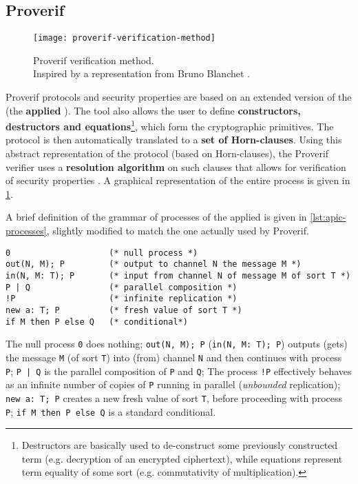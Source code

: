 \subsection{Proverif}
\begin{figure}[t]
    \texttt{[image: proverif-verification-method]}
    \centering
    \caption{Proverif verification method.\\Inspired by a representation from Bruno Blanchet \cite{SymbolicComputationalBlanchet}.}
    \label{fig:proverif-verification-method}
\end{figure}
Proverif protocols and security properties are based on an extended version of the \pic (the \textbf{applied \picnospace}). The tool also allows the user to define \textbf{constructors, destructors and equations}\footnote{Destructors are basically used to de-construct some previously constructed term (e.g. decryption of an encrypted ciphertext), while equations represent term equality of some sort (e.g. commutativity of multiplication).}, which form the cryptographic primitives. The protocol is then automatically translated to a \textbf{set of Horn-clauses}. Using this abstract representation of the protocol (based on Horn-clauses), the Proverif verifier uses a \textbf{resolution algorithm} on such clauses that allows for verification of security properties \cite{SymbolicComputationalBlanchet}.
A graphical representation of the entire process is given in \cref{fig:proverif-verification-method}.

A brief definition of the grammar of processes of the applied \pic is given in \cref{lst:apic-processes}, slightly modified to match the one actually used by Proverif.

\lstset{language=proverif}
\begin{lstlisting}[caption={Applied \pic grammar of processes.}, label={lst:apic-processes}]
0                    (* null process *)
out(N, M); P         (* output to channel N the message M *)
in(N, M: T); P       (* input from channel N of message M of sort T *)
P | Q                (* parallel composition *)
!P                   (* infinite replication *)
new a: T; P          (* fresh value of sort T *)
if M then P else Q   (* conditional*)
\end{lstlisting}

\lstset{language=proverif}
The null process \lstinline{0} does nothing;
\lstinline{out(N, M); P} (\lstinline{in(N, M: T); P}) outputs (gets) the message \lstinline{M} (of sort \lstinline{T}) into (from) channel \lstinline{N} and then continues with process \lstinline{P};
\lstinline{P | Q} is the parallel composition of \lstinline{P} and \lstinline{Q};
The process \lstinline{!P} effectively behaves as an infinite number of copies of \lstinline{P} running in parallel (\textit{unbounded} replication);
\lstinline{new a: T; P} creates a new fresh value of sort \lstinline{T}, before proceeding with process \lstinline{P};
\lstinline{if M then P else Q} is a standard conditional.

